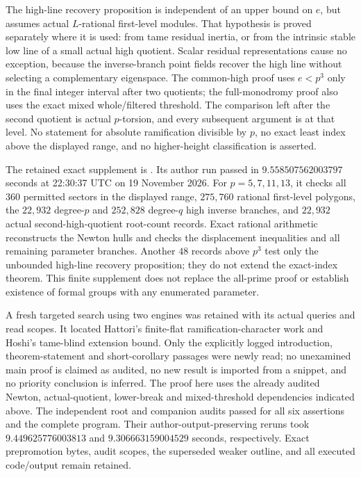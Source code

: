 \begin{remark}
\label{rem:B-RD73-scope}
The high-line recovery proposition is independent of an upper bound
on \(e\), but assumes actual \(L\)-rational first-level modules.
That hypothesis is proved separately where it is used: from tame
residual inertia, or from the intrinsic stable low line of a small
actual high quotient. Scalar residual representations cause no
exception, because the inverse-branch point fields recover the
high line without selecting a complementary eigenspace.
The common-high proof uses \(e<p^3\) only in the final integer
interval after two quotients; the full-monodromy proof also uses
the exact mixed whole/filtered threshold.
The comparison left after the second quotient is actual
\(p\)-torsion, and every subsequent argument is at that level.
No statement for absolute ramification divisible by \(p\),
no exact least index above the displayed range, and no higher-height
classification is asserted.

The retained exact supplement is
.
Its author run passed in \(9.558507562003797\) seconds at
22:30:37 UTC on 19 November 2026. For \(p=5,7,11,13\), it
checks all \(360\) permitted sectors in the displayed range,
\(275{,}760\) rational first-level polygons, the
\(22{,}932\) degree-\(p\) and \(252{,}828\) degree-\(q\)
high inverse branches, and \(22{,}932\) actual second-high-quotient
root-count records. Exact rational arithmetic reconstructs the
Newton hulls and checks the displacement inequalities and all
remaining parameter branches. Another \(48\) records above
\(p^3\) test only the unbounded high-line recovery proposition;
they do not extend the exact-index theorem. This finite supplement
does not replace the all-prime proof or establish existence of
formal groups with any enumerated parameter.

A fresh targeted search using two engines was retained with its
actual queries and read scopes. It located Hattori's finite-flat
ramification-character work and Hoshi's tame-blind extension
bound. Only the explicitly logged introduction, theorem-statement
and short-corollary passages were newly read; no unexamined main
proof is claimed as audited, no new result is imported from a
snippet, and no priority conclusion is inferred. The proof here
uses the already audited Newton, actual-quotient, lower-break and
mixed-threshold dependencies indicated above.
The independent root and companion audits passed for all six
assertions and the complete program. Their author-output-preserving
reruns took \(9.449625776003813\) and \(9.306663159004529\)
seconds, respectively. Exact prepromotion bytes, audit scopes,
the superseded weaker outline, and all executed code/output
remain retained.
\end{remark}
